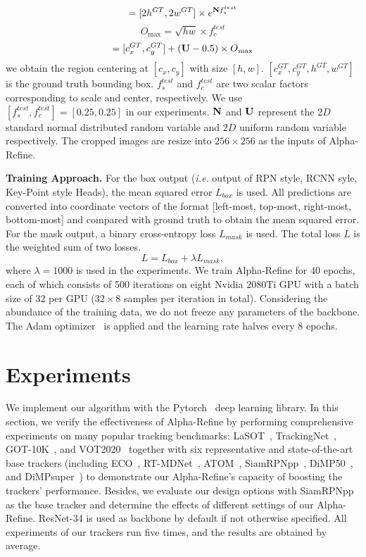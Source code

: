 \documentclass[final]{cvpr}
\begin{document}
\begin{equation}
[h,w] = [{2h^{GT}},{2w^{GT}}] \times {e^{{\bf{N}}{f_s^{test}}}}
\end{equation}
\begin{equation}
O{_{\max }} = \sqrt {hw}  \times {f_c^{test}}
\end{equation}
\begin{equation}
[{c_x},{c_y}] = [c_x^{GT},c_y^{GT}] + ({\bf{U}} - 0.5) \times O{_{\max }}
\end{equation}
we obtain the region centering at $[{c_x},{c_y}]$ with size $[h,w]$. 
$[c_x^{GT},c_y^{GT},{h^{GT}},{w^{GT}}]$ is the ground truth bounding box.
$f_s^{test}$ and $f_c^{test}$ are two scalar factors corresponding to scale and center, respectively. 
We use $[f_s^{test},f_c^{test}] = [0.25,0.25]$ in our experiments. 
$\bf{N}$ and $\bf{U}$ represent the $2D$ standard normal distributed random variable and $2D$ 
uniform random variable respectively. 
The cropped images are resize into $256 \times 256$ as the inputs of Alpha-Refine. 

{\noindent \textbf{Training Approach.}} 
For the box output (\emph{i.e.} output of RPN style, RCNN syle, Key-Point style Heads), 
the mean squared error ${L_{box}}$ is used. 
All predictions are converted into coordinate vectors of the format 
[left-most, top-most, right-most, bottom-most] 
and compared with ground truth to obtain the mean squared error.
For the mask output, a binary cross-entropy loss ${L_{mask}}$ is used.
The total loss $L$ is the weighted sum of two losses.
\begin{equation}
L = {L_{box}} + {\lambda}{L_{mask}},
\end{equation}
where ${\lambda} = 1000$ is used in the experiments. 
We train Alpha-Refine for $40$ epochs, each of which consists of 500 iterations 
on eight Nvidia 2080Ti GPU with a batch size of 32 per GPU ($32\times8$ samples 
per iteration in total). 
Considering the abundance of the training data, we do not freeze any parameters of the backbone. 
The Adam optimizer~\cite{Adam} is applied and the learning rate halves every $8$ epochs. 

\section{Experiments}\label{sec:experiment}
We implement our algorithm with the Pytorch~\cite{pytorch} deep learning library.
In this section, we verify the effectiveness of Alpha-Refine by performing comprehensive 
experiments on many popular tracking benchmarks: LaSOT~\cite{LaSOT}, TrackingNet~\cite{Trackingnet}, GOT-10K~\cite{GOT10K}, 
and VOT2020~\cite{VOT2020} together with six representative and state-of-the-art base trackers (including ECO~\cite{ECO}, 
RT-MDNet~\cite{RTMDNet}, ATOM~\cite{ATOM}, SiamRPNpp~\cite{SiamRPNplus}, DiMP50~\cite{DiMP}, and DiMPsuper~\cite{DiMP}) 
to demonstrate our Alpha-Refine's capacity of boosting the trackers' performance. 
Besides, we evaluate our design options with SiamRPNpp~\cite{SiamRPNplus} as the base tracker and 
determine the effects of different settings of our Alpha-Refine.
ResNet-34 is used as backbone by default if not otherwise specified. 
All experiments of our trackers run five times, and the results are obtained by average. 
\end{document}
